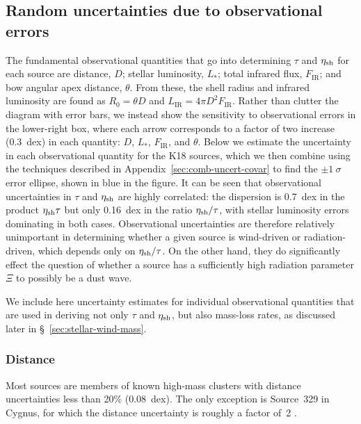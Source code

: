 \subsection{Random uncertainties due to observational errors}
\label{sec:rand-syst-uncert}

The fundamental observational quantities that go into determining
\(\tau\) and \(\eta_{\text{sh}}\) for each source are distance, \(D\); stellar
luminosity, \(L_*\); total infrared flux, \(F_{\text{IR}}\); and bow
angular apex distance, \(\theta\).  From these, the shell radius and
infrared luminosity are found as \(R_0 = \theta D\) and
\(L_{\text{IR}} = 4\pi D^2 F_{\text{IR}}\).  Rather than clutter the
diagram with error bars, we instead show the sensitivity to
observational errors in the lower-right box, where each arrow
corresponds to a factor of two increase (0.3~dex) in each quantity:
\(D\), \(L_*\), \(F_{\text{IR}}\), and \(\theta\).  Below we estimate the
uncertainty in each observational quantity for the K18 sources, which
we then combine using the techniques described in
Appendix~\ref{sec:comb-uncert-covar} to find the \(\pm 1~\sigma\) error
ellipse, shown in blue in the figure.  It can be seen that
observational uncertainties in \(\tau\) and \(\eta_{\text{sh}}\) are highly
correlated: the dispersion is \SI{0.7}{dex} in the product
\(\eta_{\text{sh}} \tau\) but only \SI{0.16}{dex} in the ratio
\(\eta_{\text{sh}}/\tau\), with stellar luminosity errors dominating in both
cases.  Observational uncertainties are therefore relatively
unimportant in determining whether a given source is wind-driven or
radiation-driven, which depends only on \(\eta_{\text{sh}}/\tau\).  On the other
hand, they do significantly effect the question of whether a source
has a sufficiently high radiation parameter \(\Xi\) to possibly be a
dust wave.

We include here uncertainty estimates for individual observational
quantities that are used in deriving not only \(\tau\) and
\(\eta_{\text{sh}}\), but also mass-loss rates, as discussed later in
\S~\ref{sec:stellar-wind-mass}.

\subsubsection{Distance}
\label{sec:distance}

Most sources are members of known high-mass clusters with distance
uncertainties less than 20\% (0.08~dex). The only exception is
Source~329 in Cygnus, for which the distance uncertainty is roughly a
factor of~2 \citep{Kobulnicky:2018a}.

